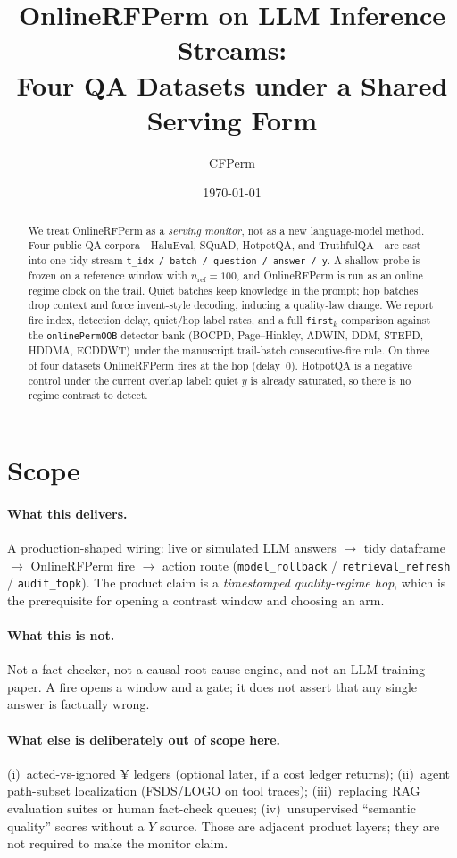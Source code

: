 \documentclass[11pt]{article}
\title{OnlineRFPerm on LLM Inference Streams:\\
Four QA Datasets under a Shared Serving Form}
\author{CFPerm}
\date{\today}
\begin{document}
\maketitle

\begin{abstract}
We treat OnlineRFPerm as a \emph{serving monitor}, not as a new language-model
method. Four public QA corpora---HaluEval, SQuAD, HotpotQA, and TruthfulQA---are
cast into one tidy stream
\texttt{t\_idx / batch / question / answer / y}.
A shallow probe is frozen on a reference window with
$n_{\mathrm{ref}}=100$, and OnlineRFPerm is run as an online regime clock on
the trail. Quiet batches keep knowledge in the prompt; hop batches drop context
and force invent-style decoding, inducing a quality-law change.
We report fire index, detection delay, quiet/hop label rates, and a full
\texttt{first}$_k$ comparison against the \texttt{onlinePermOOB} detector bank
(BOCPD, Page--Hinkley, ADWIN, DDM, STEPD, HDDMA, ECDDWT) under the manuscript
trail-batch consecutive-fire rule.
On three of four datasets OnlineRFPerm fires at the hop (delay~$0$).
HotpotQA is a negative control under the current overlap label: quiet $y$ is
already saturated, so there is no regime contrast to detect.
\end{abstract}

\section{Scope}
\paragraph{What this delivers.}
A production-shaped wiring:
live or simulated LLM answers $\to$ tidy dataframe $\to$ OnlineRFPerm fire
$\to$ action route (\texttt{model\_rollback} / \texttt{retrieval\_refresh} /
\texttt{audit\_topk}).
The product claim is a \emph{timestamped quality-regime hop}, which is the
prerequisite for opening a contrast window and choosing an arm.

\paragraph{What this is not.}
Not a fact checker, not a causal root-cause engine, and not an LLM training
paper. A fire opens a window and a gate; it does not assert that any single
answer is factually wrong.

\paragraph{What else is deliberately out of scope here.}
(i)~acted-vs-ignored ¥ ledgers (optional later, if a cost ledger returns);
(ii)~agent path-subset localization (FSDS/LOGO on tool traces);
(iii)~replacing RAG evaluation suites or human fact-check queues;
(iv)~unsupervised ``semantic quality'' scores without a $Y$ source.
Those are adjacent product layers; they are not required to make the monitor
claim.
\end{document}
